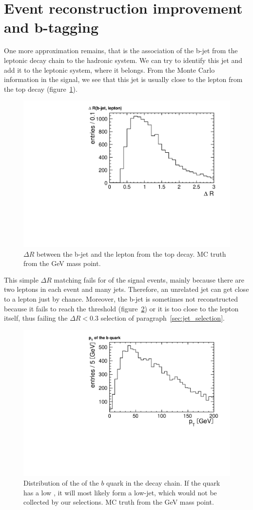 \section{Event reconstruction improvement and
b-tagging}\label{sec:razor_btagging}
One more approximation remains, that is the association of the b-jet from the leptonic decay
chain to the hadronic system. We can try to identify this jet and add it to
the leptonic system, where it belongs.
From the Monte Carlo information in the signal, we see that this jet is
usually close to the lepton from the top decay
(figure~\ref{fig:dr_jet_lepton}).
\begin{figure}[h]
    \centering
    \includegraphics[width=.7\textwidth]{images/pdf/dr_bjet_lepton_canvas}
    \caption{$\Delta R$ between the b-jet and the lepton from the top
        decay. MC truth from the \unit[550]{GeV} mass point.}
        \label{fig:dr_jet_lepton}
\end{figure}
This simple $\Delta R$ matching fails for  of the
signal events, mainly because there are two leptons in each event and many
jets. Therefore, an unrelated jet can get close to a lepton just by chance.
Moreover, the b-jet is sometimes not reconstructed because it fails to reach the \pt
threshold (figure~\ref{fig:b_pt}) or it is too close to the lepton itself,
thus failing the $\Delta R < 0.3$ selection of
paragraph~\ref{sec:jet_selection}.


\begin{figure}[h]
    \centering
    \includegraphics[width=.7\textwidth]{images/pdf/b_quark_pt_canvas}
    \caption{Distribution of the \pt of the $b$ quark in the \TP decay
        chain. If the quark has a low \pt, it will most likely form a
        low-\pt jet, which would not be collected by our selections. MC truth from the \unit[550]{GeV} mass point.}
        \label{fig:b_pt}
\end{figure}

